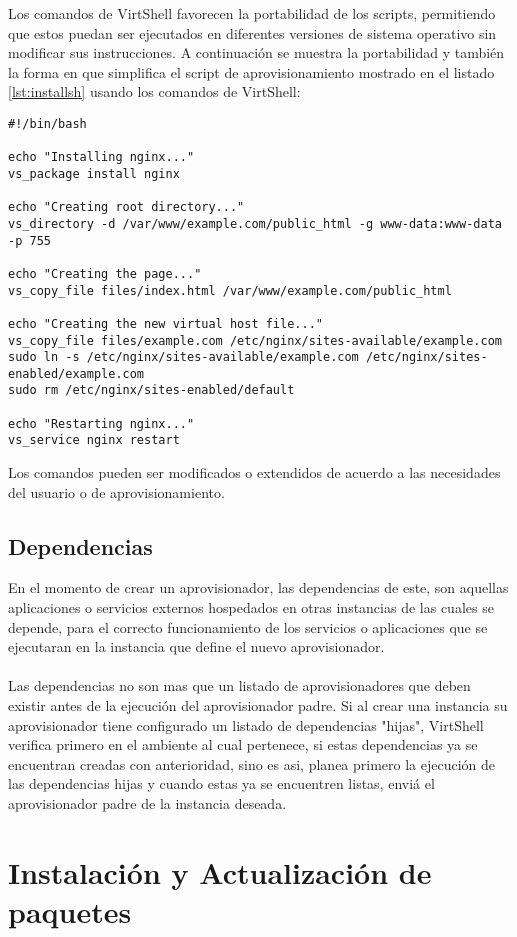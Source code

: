 Los comandos de VirtShell favorecen la portabilidad de los scripts, permitiendo que estos puedan ser ejecutados en diferentes versiones de sistema operativo sin modificar sus instrucciones. A continuación se muestra la portabilidad y también la forma en que simplifica el script de aprovisionamiento mostrado en el listado \ref{lst:installsh} usando los comandos de VirtShell:

\begin{lstlisting}[style=json, caption=Ejemplo de un script shell usando los comandos de VirtShell]
#!/bin/bash

echo "Installing nginx..."
vs_package install nginx

echo "Creating root directory..."
vs_directory -d /var/www/example.com/public_html -g www-data:www-data -p 755

echo "Creating the page..."
vs_copy_file files/index.html /var/www/example.com/public_html

echo "Creating the new virtual host file..."
vs_copy_file files/example.com /etc/nginx/sites-available/example.com
sudo ln -s /etc/nginx/sites-available/example.com /etc/nginx/sites-enabled/example.com
sudo rm /etc/nginx/sites-enabled/default

echo "Restarting nginx..."
vs_service nginx restart
\end{lstlisting}

\vspace{5mm}

Los comandos pueden ser modificados o extendidos de acuerdo a las necesidades del usuario o de aprovisionamiento.

\subsection{Dependencias}
En el momento de crear un aprovisionador, las dependencias de este, son aquellas aplicaciones o servicios externos hospedados en otras instancias de las cuales se depende, para el correcto funcionamiento de los servicios o aplicaciones que se ejecutaran en la instancia que define el nuevo aprovisionador.\\
\\
Las dependencias no son mas que un listado de aprovisionadores que deben existir antes de la ejecución del aprovisionador padre. Si al crear una instancia su aprovisionador tiene configurado un listado de dependencias "hijas", VirtShell verifica primero en el ambiente al cual pertenece, si estas dependencias ya se encuentran creadas con anterioridad, sino es asi, planea primero la ejecución de las dependencias hijas y cuando estas ya se encuentren listas, enviá el aprovisionador padre de la instancia deseada.

\section{Instalación y Actualización de paquetes}





